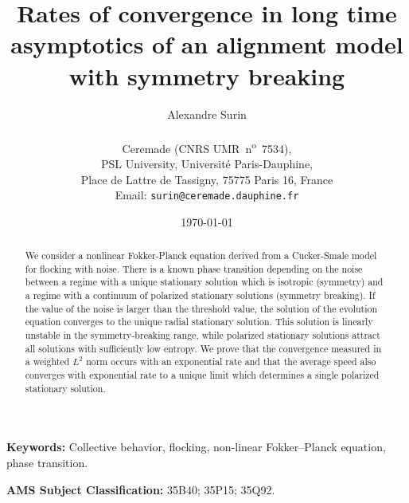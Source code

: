 \documentclass[reqno]{amsart} %
\title[Rates of convergence in alignment models]{Rates of convergence in long time asymptotics of an alignment model with symmetry breaking}
\author[A. Surin]{%
  \normalfont Alexandre Surin\\[6pt] \\
  \small
  Ceremade (CNRS UMR~n\textsuperscript{o}~7534),\\
  PSL University, Université Paris-Dauphine,\\
  Place de Lattre de Tassigny, 75775 Paris 16, France\\
 Email: \texttt{surin@ceremade.dauphine.fr}
}
\date{\today}
\author@andify\authors
\begin{document}
\begin{abstract}
    We consider a nonlinear Fokker-Planck equation derived from a Cucker-Smale model for flocking with noise. There is a known phase transition depending on the noise between a regime with a unique stationary solution which is isotropic (symmetry) and a regime with a continuum of polarized stationary solutions (symmetry breaking). If the value of the noise is larger than the threshold value, the solution of the evolution equation converges to the unique radial stationary solution. This solution is linearly unstable in the symmetry-breaking range, while polarized stationary solutions attract all solutions with sufficiently low entropy. We prove that the convergence measured in a weighted $L^2$ norm occurs with an exponential rate and that the average speed also converges with exponential rate to a unique limit which determines a single polarized stationary solution.
\end{abstract}
\maketitle
\noindent\textbf{Keywords:} Collective behavior, flocking, non-linear Fokker--Planck equation, phase transition.


\noindent\textbf{AMS Subject Classification:} 35B40; 35P15; 35Q92.
 
\end{document}
